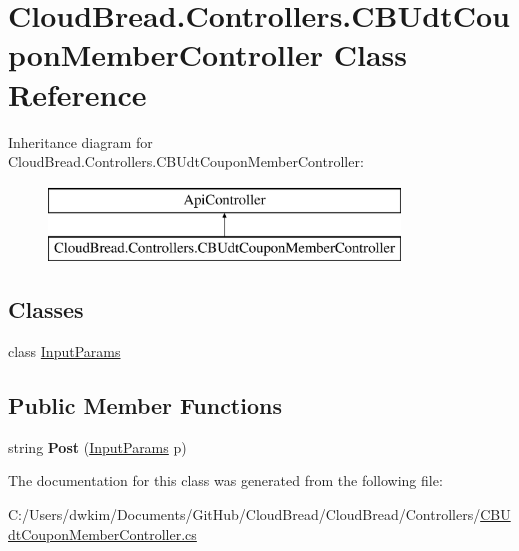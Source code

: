 \hypertarget{a00057}{}\section{Cloud\+Bread.\+Controllers.\+C\+B\+Udt\+Coupon\+Member\+Controller Class Reference}
\label{a00057}
Inheritance diagram for Cloud\+Bread.\+Controllers.\+C\+B\+Udt\+Coupon\+Member\+Controller\+:\begin{figure}[H]
\begin{center}
\leavevmode
\includegraphics[height=2.000000cm]{a00057}
\end{center}
\end{figure}
\subsection*{Classes}
\begin{DoxyCompactItemize}
\item 
class \hyperlink{a00107}{Input\+Params}
\end{DoxyCompactItemize}
\subsection*{Public Member Functions}
\begin{DoxyCompactItemize}
\item 
string {\bfseries Post} (\hyperlink{a00107}{Input\+Params} p)\hypertarget{a00057_a55a2e1a6013d3916235ccd6054efb91e}{}\label{a00057_a55a2e1a6013d3916235ccd6054efb91e}

\end{DoxyCompactItemize}


The documentation for this class was generated from the following file\+:\begin{DoxyCompactItemize}
\item 
C\+:/\+Users/dwkim/\+Documents/\+Git\+Hub/\+Cloud\+Bread/\+Cloud\+Bread/\+Controllers/\hyperlink{a00228}{C\+B\+Udt\+Coupon\+Member\+Controller.\+cs}\end{DoxyCompactItemize}
